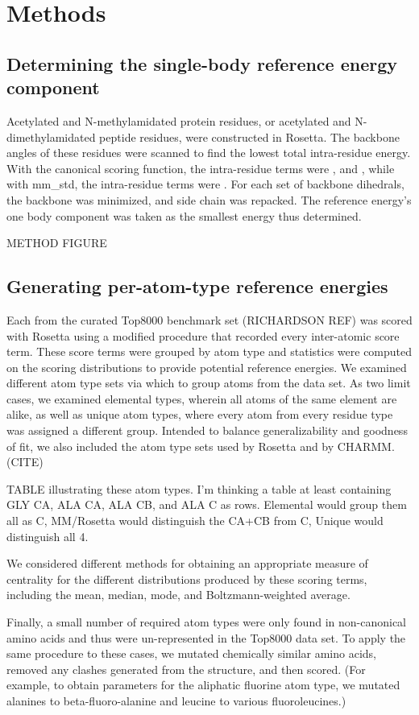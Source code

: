 \section{Methods}
\subsection{Determining the single-body reference energy component}
Acetylated and N-methylamidated protein residues, or acetylated and N-dimethylamidated peptide residues, were constructed in Rosetta. The backbone angles of these residues were scanned to find the lowest total intra-residue energy. With the canonical scoring function, the intra-residue terms were , and , while with mm\_std, the intra-residue terms were . For each set of backbone dihedrals, the backbone was minimized, and side chain was repacked. The reference energy's one body component was taken as the smallest energy thus determined.

METHOD FIGURE

\subsection{Generating per-atom-type reference energies}

Each from the curated Top8000 benchmark set (RICHARDSON REF) was scored with Rosetta using a modified procedure that recorded every inter-atomic score term. These score terms were grouped by atom type and statistics were computed on the scoring distributions to provide potential reference energies. We examined different atom type sets via which to group atoms from the data set. As two limit cases, we examined elemental types, wherein all atoms of the same element are alike, as well as unique atom types, where every atom from every residue type was assigned a different group. Intended to balance generalizability and goodness of fit, we also included the atom type sets used by Rosetta and by CHARMM.(CITE)

TABLE illustrating these atom types. I'm thinking a table at least containing GLY CA, ALA CA, ALA CB, and ALA C as rows. Elemental would group them all as C, MM/Rosetta would distinguish the CA+CB from C, Unique would distinguish all 4.

We considered different methods for obtaining an appropriate measure of centrality for the different distributions produced by these scoring terms, including the mean, median, mode, and Boltzmann-weighted average.
 
Finally, a small number of required atom types were only found in non-canonical amino acids and thus were un-represented in the Top8000 data set. To apply the same procedure to these cases, we mutated chemically similar amino acids, removed any clashes generated from the structure, and then scored. (For example, to obtain parameters for the aliphatic fluorine atom type, we mutated alanines to beta-fluoro-alanine and leucine to various fluoroleucines.)